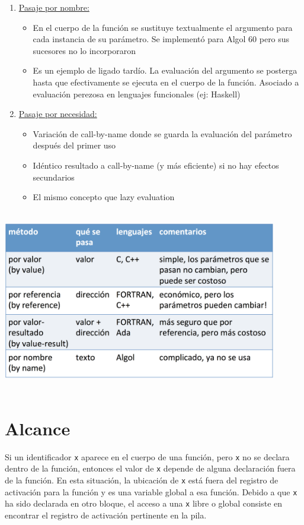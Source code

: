 \documentclass[10pt,a4paper]{report}
\begin{document}
\begin{enumerate}
    \item \underline{Pasaje por nombre:}
    \begin{itemize}
    \item En el cuerpo de la función se sustituye textualmente el argumento 
    para cada instancia de su parámetro. Se implementó para Algol 60 pero 
    sus sucesores no lo     incorporaron
    \item Es un ejemplo de ligado tardío. La evaluación del argumento se 
    posterga hasta que efectivamente se ejecuta en el cuerpo de la función.
    Asociado a evaluación perezosa en lenguajes funcionales (ej: Haskell)
    \end{itemize}
    
    \item \underline{Pasaje por necesidad:}
    \begin{itemize}
    \item Variación de call-by-name donde se guarda la evaluación del 
    parámetro después del primer uso
    \item Idéntico resultado a call-by-name (y más eficiente) si no hay 
    efectos secundarios
    \item El mismo concepto que lazy evaluation
    \end{itemize}

\end{enumerate}

\begin{center}  
        \includegraphics[width=12cm, height=8cm]{resumenpasajes.png}
\end{center}

\section{Alcance}
\par Si un identificador \verb|x| aparece en el cuerpo de una función, pero
\verb|x| no se declara dentro de la función, entonces el valor de
\verb|x| depende de alguna declaración fuera de la función. En esta
situación, la ubicación de \verb|x| está fuera del registro de
activación para la función y es una variable global a esa
función. Debido a que \verb|x| ha sido declarada en otro bloque, el
acceso a una \verb|x| libre o global consiste en encontrar el registro
de activación pertinente en la pila.
\end{document}
